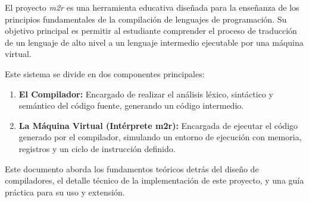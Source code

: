 El proyecto \textit{m2r} es una herramienta educativa diseñada para la enseñanza de los principios fundamentales de la compilación de lenguajes de programación. Su objetivo principal es permitir al estudiante comprender el proceso de traducción de un lenguaje de alto nivel a un lenguaje intermedio ejecutable por una máquina virtual.

Este sistema se divide en dos componentes principales:
\begin{enumerate}
    \item \textbf{El Compilador:} Encargado de realizar el análisis léxico, sintáctico y semántico del código fuente, generando un código intermedio.
    \item \textbf{La Máquina Virtual (Intérprete m2r):} Encargada de ejecutar el código generado por el compilador, simulando un entorno de ejecución con memoria, registros y un ciclo de instrucción definido.
\end{enumerate}

Este documento aborda los fundamentos teóricos detrás del diseño de compiladores, el detalle técnico de la implementación de este proyecto, y una guía práctica para su uso y extensión.
